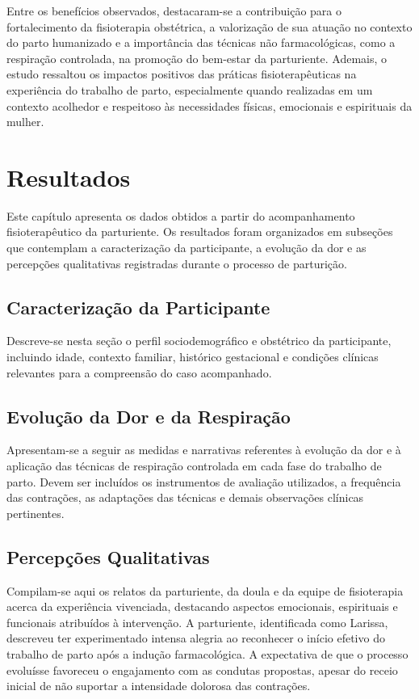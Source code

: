 \documentclass[openright]{normas-utf-tex}
\begin{document}
Entre os benefícios observados, destacaram-se a contribuição para o fortalecimento da fisioterapia obstétrica, a valorização de sua atuação no contexto do parto humanizado e a importância das técnicas não farmacológicas, como a respiração controlada, na promoção do bem-estar da parturiente. Ademais, o estudo ressaltou os impactos positivos das práticas fisioterapêuticas na experiência do trabalho de parto, especialmente quando realizadas em um contexto acolhedor e respeitoso às necessidades físicas, emocionais e espirituais da mulher.

\chapter{Resultados}
\label{chap:resultados}

Este capítulo apresenta os dados obtidos a partir do acompanhamento fisioterapêutico da parturiente. Os resultados foram organizados em subseções que contemplam a caracterização da participante, a evolução da dor e as percepções qualitativas registradas durante o processo de parturição.

\section{Caracterização da Participante}
\label{sec:caracterizacao}

Descreve-se nesta seção o perfil sociodemográfico e obstétrico da participante, incluindo idade, contexto familiar, histórico gestacional e condições clínicas relevantes para a compreensão do caso acompanhado.

\section{Evolução da Dor e da Respiração}
\label{sec:evolucao}

Apresentam-se a seguir as medidas e narrativas referentes à evolução da dor e à aplicação das técnicas de respiração controlada em cada fase do trabalho de parto. Devem ser incluídos os instrumentos de avaliação utilizados, a frequência das contrações, as adaptações das técnicas e demais observações clínicas pertinentes.

\section{Percepções Qualitativas}
\label{sec:percepcoes}

Compilam-se aqui os relatos da parturiente, da doula e da equipe de fisioterapia acerca da experiência vivenciada, destacando aspectos emocionais, espirituais e funcionais atribuídos à intervenção. A parturiente, identificada como Larissa, descreveu ter experimentado intensa alegria ao reconhecer o início efetivo do trabalho de parto após a indução farmacológica. A expectativa de que o processo evoluísse favoreceu o engajamento com as condutas propostas, apesar do receio inicial de não suportar a intensidade dolorosa das contrações.
\end{document}

